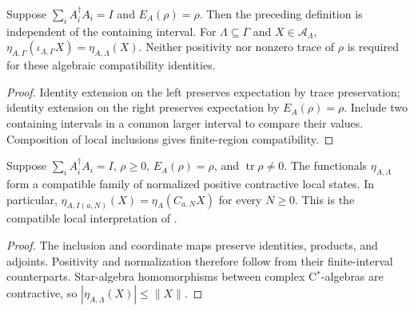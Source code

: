 \begin{lemma}
    \label{thm:mps_finite_region_expectation_compatible}
    \leanok
    Suppose $\sum_i A_i^\dagger A_i=I$ and $E_A(\rho)=\rho$.
    Then the preceding definition is independent of the containing interval.
    For $\Lambda\subseteq\Gamma$ and $X\in\mathcal A_\Lambda$,
    $\eta_{A,\Gamma}(\iota_{\Lambda,\Gamma}X)=\eta_{A,\Lambda}(X)$.
    Neither positivity nor nonzero trace of $\rho$ is required for these
    algebraic compatibility identities.
\end{lemma}
\begin{proof}\leanok
    Identity extension on the left preserves expectation by trace preservation;
    identity extension on the right preserves expectation by $E_A(\rho)=\rho$.
    Include two containing intervals in a common larger interval to compare
    their values. Composition of local inclusions gives finite-region compatibility.
\end{proof}

\begin{definition}
    \label{def:mps_compatible_local_state}
    \leanok
    Suppose $\sum_i A_i^\dagger A_i=I$, $\rho\geq0$,
    $E_A(\rho)=\rho$, and $\operatorname{tr}\rho\neq0$.
    The functionals $\eta_{A,\Lambda}$ form a compatible family of
    normalized positive contractive local states. In particular,
    $\eta_{A,I(a,N)}(X)=\eta_A(C_{a,N}X)$ for every $N\geq0$.
    This is the compatible local interpretation of
    \cite[Section~3, equations (3.1)--(3.2b)]{Nachtergaele1996Spectral}.
\end{definition}
\begin{proof}\leanok
    The inclusion and coordinate maps preserve identities, products, and
    adjoints. Positivity and normalization therefore follow from their
    finite-interval counterparts. Star-algebra homomorphisms between
    complex C$^*$-algebras are contractive, so
    $|\eta_{A,\Lambda}(X)|\leq\|X\|$.
\end{proof}

